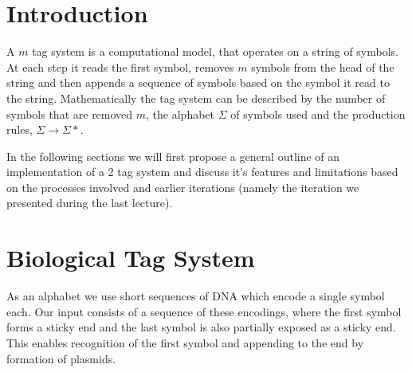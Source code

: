 \documentclass[
11pt, %
a4paper, %
oneside, %
headinclude,footinclude, %
BCOR5mm, %
]{scrartcl}
\begin{document}




\newpage %


\section{Introduction}

A $m$ tag system is a computational model, that operates on a string of symbols.
At each step it reads the first symbol, removes $m$ symbols from the head of the
string and then appends a sequence of symbols based on the symbol it read to the
string.
Mathematically the tag system can be described by the number of symbols that
are removed $m$, the alphabet $\Sigma$ of symbols used and the production rules,
$\Sigma \to \Sigma*$.


In the following sections we will first propose a general outline of an
implementation of a 2 tag system and discuss it's features and limitations
based on the processes involved and earlier iterations (namely the iteration
we presented during the last lecture).

\section{Biological Tag System}

As an alphabet we use short sequences of DNA which encode a single symbol each.
Our input consists of a sequence of these encodings, where the first symbol
forms a sticky end and the last symbol is also partially exposed as a sticky
end.
This enables recognition of the first symbol and appending to the end by
formation of plasmids.
\end{document}

